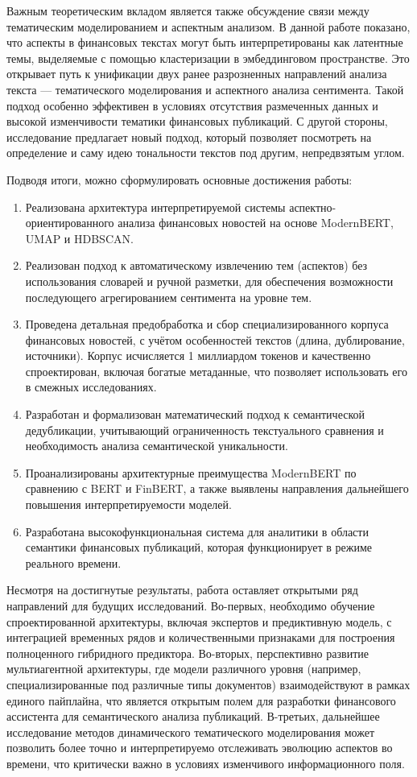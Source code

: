 Важным теоретическим вкладом является также обсуждение связи между тематическим моделированием и аспектным
анализом. В данной работе показано, что аспекты в финансовых текстах могут быть интерпретированы как латентные
темы, выделяемые с помощью кластеризации в эмбеддинговом пространстве. Это открывает путь к унификации двух
ранее разрозненных направлений анализа текста — тематического моделирования и аспектного анализа сентимента.
Такой подход особенно эффективен в условиях отсутствия размеченных данных и высокой изменчивости тематики
финансовых публикаций. С другой стороны, исследование предлагает новый подход, который позволяет посмотреть
на определение и саму идею тональности текстов под другим, непредвзятым углом.

Подводя итоги, можно сформулировать основные достижения работы:

\begin{enumerate}
    \item Реализована архитектура интерпретируемой системы аспектно-ориентированного анализа финансовых новостей
    на основе ModernBERT, UMAP и HDBSCAN.
    \item Реализован подход к автоматическому извлечению тем (аспектов) без использования словарей и ручной разметки,
    для обеспечения возможности последующего агрегированием сентимента на уровне тем.
    \item Проведена детальная предобработка и сбор специализированного корпуса финансовых новостей, с учётом
    особенностей текстов (длина, дублирование, источники). Корпус исчисляется 1 миллиардом токенов и качественно
    спроектирован, включая богатые метаданные, что позволяет использовать его в смежных исследованиях.
    \item Разработан и формализован математический подход к семантической дедубликации, учитывающий ограниченность
    текстуального сравнения и необходимость анализа семантической уникальности.
    \item Проанализированы архитектурные преимущества ModernBERT по сравнению с BERT и FinBERT,
    а также выявлены направления дальнейшего повышения интерпретируемости моделей.
    \item Разработана высокофункциональная система для аналитики в области семантики финансовых публикаций,
    которая функционирует в режиме реального времени.
\end{enumerate}

Несмотря на достигнутые результаты, работа оставляет открытыми ряд направлений для будущих исследований.
Во-первых, необходимо обучение спроектированной архитектуры, включая экспертов и предиктивную модель,
с интеграцией временных рядов и количественными признаками для построения полноценного гибридного предиктора.
Во-вторых, перспективно развитие мультиагентной архитектуры, где модели различного уровня (например,
специализированные под различные типы документов) взаимодействуют в рамках единого пайплайна, что является
открытым полем для разработки финансового ассистента для семантического анализа публикаций. В-третьих,
дальнейшее исследование методов динамического тематического моделирования может позволить более точно
и интерпретируемо отслеживать эволюцию аспектов во времени, что критически важно в условиях изменчивого
информационного поля.

